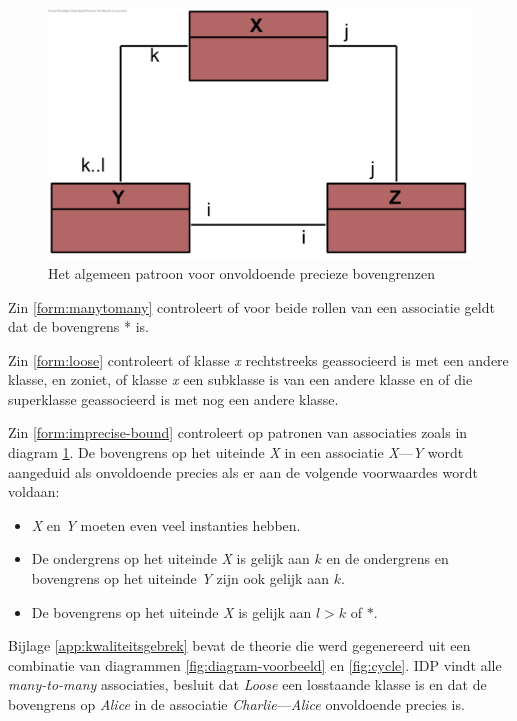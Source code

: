 \begin{figure}
	\centering
	\includegraphics{chap-kwaliteitsgebrek/cyclegen.png}
	\caption{Het algemeen patroon voor onvoldoende precieze bovengrenzen}
	\label{fig:cyclegen}
\end{figure}

Zin \ref{form:manytomany} controleert of voor beide rollen van een associatie geldt dat de bovengrens * is.

Zin \ref{form:loose} controleert of klasse \textit{x} rechtstreeks geassocieerd is met een andere klasse, en zoniet, of klasse \textit{x} een subklasse is van een andere klasse en of die superklasse geassocieerd is met nog een andere klasse.

Zin \ref{form:imprecise-bound} controleert op patronen van associaties zoals in diagram \ref{fig:cyclegen}. De bovengrens op het uiteinde \textit{X} in een associatie \textit{X}---\textit{Y} wordt aangeduid als onvoldoende precies als er aan de volgende voorwaardes wordt voldaan:

\begin{itemize}
	\item \textit{X} en \textit{Y} moeten even veel instanties hebben.
	\item De ondergrens op het uiteinde \textit{X} is gelijk aan $k$ en de ondergrens en bovengrens op het uiteinde \textit{Y} zijn ook gelijk aan $k$.
	\item De bovengrens op het uiteinde \textit{X} is gelijk aan $l > k$ of $*$.
\end{itemize}

Bijlage \ref{app:kwaliteitsgebrek} bevat de theorie die werd gegenereerd uit een combinatie van diagrammen \ref{fig:diagram-voorbeeld} en \ref{fig:cycle}. IDP
vindt alle \textit{many-to-many} associaties, besluit dat \textit{Loose} een losstaande klasse is en dat de bovengrens op \textit{Alice} in de associatie \textit{Charlie}---\textit{Alice} onvoldoende precies is.